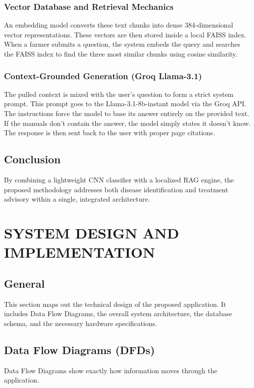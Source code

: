 \documentclass[12pt, a4paper]{report}
\begin{document}
\subsection{Vector Database and Retrieval Mechanics}
An embedding model converts these text chunks into dense 384-dimensional vector representations. These vectors are then stored inside a local FAISS index. When a farmer submits a question, the system embeds the query and searches the FAISS index to find the three most similar chunks using cosine similarity.

\subsection{Context-Grounded Generation (Groq Llama-3.1)}
The pulled context is mixed with the user's question to form a strict system prompt. This prompt goes to the Llama-3.1-8b-instant model via the Groq API. The instructions force the model to base its answer entirely on the provided text. If the manuals don't contain the answer, the model simply states it doesn't know. The response is then sent back to the user with proper page citations.

\section{Conclusion}
By combining a lightweight CNN classifier with a localized RAG engine, the proposed methodology addresses both disease identification and treatment advisory within a single, integrated architecture.

\chapter{SYSTEM DESIGN AND IMPLEMENTATION}

\section{General}
This section maps out the technical design of the proposed application. It includes Data Flow Diagrams, the overall system architecture, the database schema, and the necessary hardware specifications.

\section{Data Flow Diagrams (DFDs)}
Data Flow Diagrams show exactly how information moves through the application.
\end{document}
